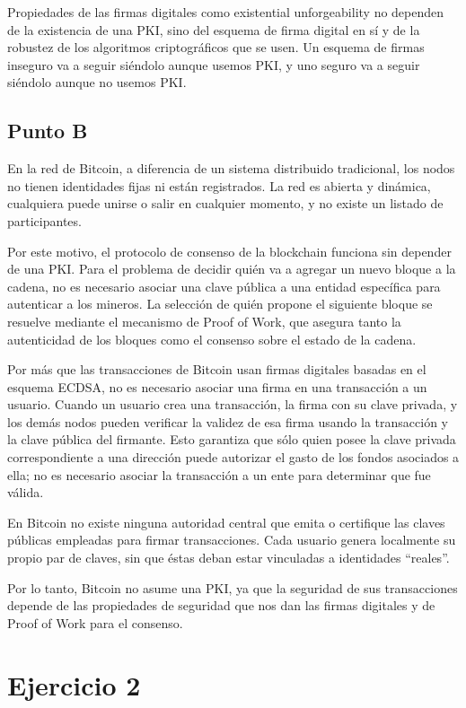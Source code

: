 \documentclass[12pt]{article}
\begin{document}
Propiedades de las firmas digitales como existential unforgeability no dependen de la existencia de una PKI, sino del esquema de firma digital en sí y de la robustez de los algoritmos criptográficos que se usen. Un esquema de firmas inseguro va a seguir siéndolo aunque usemos PKI, y uno seguro va a seguir siéndolo aunque no usemos PKI.

\subsection*{Punto B}

En la red de Bitcoin, a diferencia de un sistema distribuido tradicional, los nodos no tienen identidades fijas ni están registrados.
La red es abierta y dinámica, cualquiera puede unirse o salir en cualquier momento, y no existe un listado de participantes.

Por este motivo, el protocolo de consenso de la blockchain funciona sin depender de una PKI.
Para el problema de decidir quién va a agregar un nuevo bloque a la cadena, no es necesario asociar una clave pública a una entidad específica para autenticar a los mineros.
La selección de quién propone el siguiente bloque se resuelve mediante el mecanismo de Proof of Work, que asegura tanto la autenticidad de los bloques como el consenso sobre el estado de la cadena.

Por más que las transacciones de Bitcoin usan firmas digitales basadas en el esquema ECDSA, no es necesario asociar una firma en una transacción a un usuario.
Cuando un usuario crea una transacción, la firma con su clave privada, y los demás nodos pueden verificar la validez de esa firma usando la transacción y la clave pública del firmante.
Esto garantiza que sólo quien posee la clave privada correspondiente a una dirección puede autorizar el gasto de los fondos asociados a ella; no es necesario asociar la transacción a un ente para determinar que fue válida.

En Bitcoin no existe ninguna autoridad central que emita o certifique las claves públicas empleadas para firmar transacciones.
Cada usuario genera localmente su propio par de claves, sin que éstas deban estar vinculadas a identidades “reales”.

Por lo tanto, Bitcoin no asume una PKI, ya que la seguridad de sus transacciones depende de las propiedades de seguridad que nos dan las firmas digitales y de Proof of Work para el consenso.

\section*{Ejercicio 2}
\end{document}
